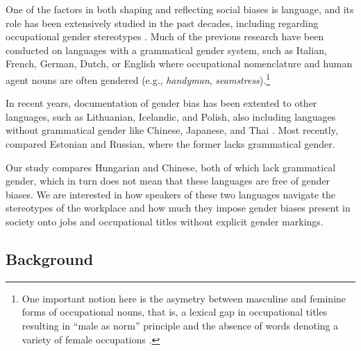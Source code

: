 \documentclass[11pt]{article}
\begin{document}
One of the factors in both shaping and reflecting social biases is language, and its role has been extensively studied in the past decades, including regarding occupational gender stereotypes \citep[cf.][]{sabatini_1985_occupational,pauwels_1997_handymen,gygax_2008_generically,misersky_2014_norms,lewis_2020_gender,kaukonen_2025_gender}. Much of the previous research have been conducted on languages with a grammatical gender system, such as Italian, French, German, Dutch, or English where occupational nomenclature and human agent nouns are often gendered (e.g., \textit{handyman}, \textit{seamstress}).\footnote{One important notion here is the asymetry between masculine and feminine forms of occupational nouns, that is, a lexical gap in occupational titles resulting in ``male as norm'' principle and the absence of words denoting a variety of female occupations \citep{baron_1986_grammar,hellinger_1990_kontrastive,sabatini_1985_occupational,yaguello_1978_mots,pauwels_2003_linguistic,lassonde_2013_occupational}.} 



In recent years, documentation of gender bias has been extented to other languages, such as Lithuanian, Icelandic, and Polish, also including languages without grammatical gender like Chinese, Japanese, and Thai \citep[][]{hellinger_2003_gender,pauwels_2003_linguistic}. Most recently, \citet{kaukonen_2025_gender} compared Estonian and Russian, where the former lacks grammatical gender.

Our study compares Hungarian and Chinese, both of which lack grammatical gender, which in turn does not mean that these languages are free of gender biases. We are interested in how speakers of these two languages navigate the stereotypes of the workplace and how much they impose gender biases present in society onto jobs and occupational titles without explicit gender markings.

\subsection{Background}
\end{document}
